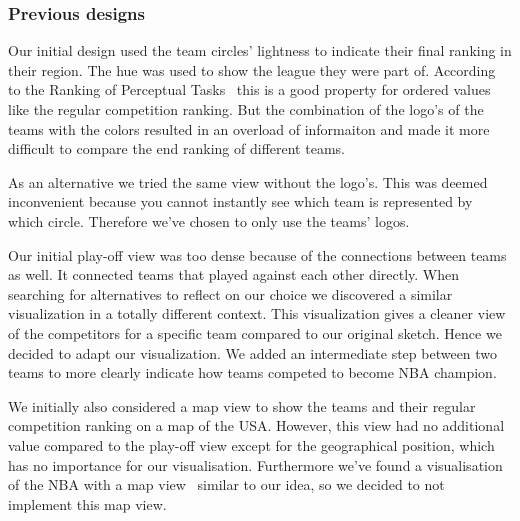 \documentclass[chi_draft]{sigchi}
\begin{document}
\subsubsection{Previous designs}
Our initial design used the team circles' lightness to indicate their final
ranking in their region. The hue was used to show the league they were part of.
According to the Ranking of Perceptual Tasks~\cite{perceptualranking} this is a
good property for ordered values like the regular competition ranking. But the
combination of the logo's of the teams with the colors resulted in an overload
of informaiton and made it more difficult to compare the end ranking of
different teams. 

As an alternative we tried the same view without the logo's. This was deemed
inconvenient because you cannot instantly see which team is represented by which
circle. Therefore we've chosen to only use the teams' logos.

Our initial play-off view was too dense because of the connections between teams
as well. It connected teams that played against each other directly. When
searching for alternatives to reflect on our choice we discovered a similar
visualization in a totally different context\cite{whitehousepath}.  This
visualization gives a cleaner view of the competitors for a specific team
compared to our original sketch. Hence we decided to adapt our visualization. We
added an intermediate step between two teams to more clearly indicate how teams
competed to become NBA champion.


We initially also considered a map view to show the teams and their regular
competition ranking on a map of the USA. However, this view had no additional
value compared to the play-off view except for the geographical position, which
has no importance for our visualisation. Furthermore we've found a visualisation
of the NBA with a map view~\cite{mapviewvisualization} similar to our idea, so
we decided to not implement this map view. 
\end{document}
